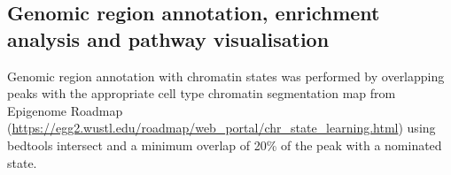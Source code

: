 



\subsection{Genomic region annotation, enrichment analysis and pathway visualisation}
Genomic region annotation with chromatin states was performed by overlapping peaks with the appropriate cell type chromatin segmentation map from Epigenome Roadmap (\url{https://egg2.wustl.edu/roadmap/web_portal/chr_state_learning.html}) using bedtools intersect and a minimum overlap of 20\% of the peak with a nominated state.

